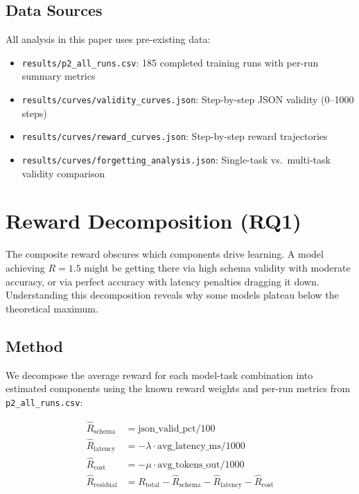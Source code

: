 \documentclass[11pt]{article}
\begin{document}
\subsection{Data Sources}

All analysis in this paper uses pre-existing data:
\begin{itemize}[leftmargin=*]
\item \texttt{results/p2\_all\_runs.csv}: 185 completed training runs with per-run summary metrics
\item \texttt{results/curves/validity\_curves.json}: Step-by-step JSON validity (0--1000 steps)
\item \texttt{results/curves/reward\_curves.json}: Step-by-step reward trajectories
\item \texttt{results/curves/forgetting\_analysis.json}: Single-task vs.\ multi-task validity comparison
\end{itemize}

\section{Reward Decomposition (RQ1)}
\label{sec:reward}

The composite reward obscures which components drive learning.  A model achieving $R = 1.5$ might be getting there via high schema validity with moderate accuracy, or via perfect accuracy with latency penalties dragging it down.  Understanding this decomposition reveals why some models plateau below the theoretical maximum.

\subsection{Method}

We decompose the average reward for each model-task combination into estimated components using the known reward weights and per-run metrics from \texttt{p2\_all\_runs.csv}:

\begin{align}
\hat{R}_{\text{schema}} &= \text{json\_valid\_pct} / 100 \\
\hat{R}_{\text{latency}} &= -\lambda \cdot \text{avg\_latency\_ms} / 1000 \\
\hat{R}_{\text{cost}} &= -\mu \cdot \text{avg\_tokens\_out} / 1000 \\
\hat{R}_{\text{residual}} &= R_{\text{total}} - \hat{R}_{\text{schema}} - \hat{R}_{\text{latency}} - \hat{R}_{\text{cost}}
\end{align}
\end{document}
